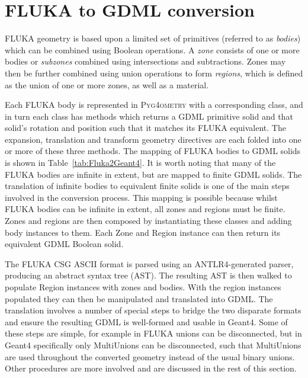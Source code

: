 \documentclass[final,5p,times,twocolumn]{elsarticle}
\newcommand{\PYGEOMETRY}{\textsc{Pyg4ometry}}
\begin{document}
\section{FLUKA to GDML conversion}
FLUKA geometry is based upon a limited set of primitives (referred to as
\textit{bodies}) which can be combined using Boolean operations. A
\textit{zone} consists of one or more bodies or \textit{subzones} combined
using intersections and subtractions.  Zones may then be further combined
using union operations to form \textit{regions}, which is defined as the
union of one or more zones, as well as a material.

Each FLUKA body is represented in \PYGEOMETRY{} with a corresponding
class, and in turn each class has methods which returns a GDML
primitive solid and that solid's rotation and position such that it
matches its FLUKA equivalent.  The expansion, translation and
transform geometry directives are each folded into one or more of
these three methods.  The mapping of FLUKA bodies to GDML solids is
shown in Table~\ref{tab:Fluka2Geant4}.  It is worth noting that many
of the FLUKA bodies are infinite in extent, but are mapped to finite
GDML solids.  The translation of infinite bodies to equivalent finite
solids is one of the main steps involved in the conversion process.
This mapping is possible because whilst FLUKA bodies can be infinite
in extent, all zones and regions must be finite.  Zones and regions
are then composed by instantiating these classes and adding body
instances to them.  Each Zone and Region instance can then return its
equivalent GDML Boolean solid.

The FLUKA CSG ASCII format is parsed using an ANTLR4-generated parser,
producing an abstract syntax tree (AST).  The resulting AST is then walked
to populate Region instances with zones and bodies.  With the region
instances populated they can then be manipulated and translated into GDML.
The translation involves a number of special steps to bridge the two
disparate formats and ensure the resulting GDML is well-formed and usable
in Geant4.  Some of these steps are simple, for example in FLUKA unions can
be disconnected, but in Geant4 specifically only MultiUnions can be
disconnected, such that MultiUnions are used throughout the converted
geometry instead of the usual binary unions.  Other procedures are more
involved and are discussed in the rest of this section.
\end{document}
